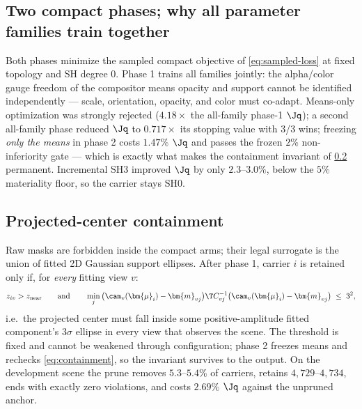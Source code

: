 \subsection{Two compact phases; why all parameter families train together}
\label{sec:phases}

Both phases minimize the sampled compact objective of \cref{eq:sampled-loss} at fixed
topology and SH degree 0.  Phase 1 trains all families jointly: the alpha/color gauge freedom
of the compositor means opacity and support cannot be identified independently --- scale,
orientation, opacity, and color must co-adapt.  Means-only optimization was strongly
rejected ($4.18\times$ the all-family phase-1 $\Jq$); a second all-family phase reduced
$\Jq$ to $0.717\times$ its stopping value with 3/3 wins; freezing \emph{only the means} in
phase 2 costs $1.47\%$ $\Jq$ and passes the frozen $2\%$ non-inferiority gate --- which is
exactly what makes the containment invariant of \cref{sec:containment} permanent.
Incremental SH3 improved $\Jq$ by only $2.3$--$3.0\%$, below the $5\%$ materiality floor, so
the carrier stays SH0.

\subsection{Projected-center containment}
\label{sec:containment}

Raw masks are forbidden inside the compact arms; their legal surrogate is the union of fitted
2D Gaussian support ellipses.  After phase 1, carrier $i$ is retained only if, for
\emph{every} fitting view $v$:
\begin{equation}
  z_{iv} > z_{\text{near}}
  \qquad\text{and}\qquad
  \min_j \big(\cam_v(\bm{\mu}_i) - \bm{m}_{vj}\big)\T C_{vj}^{-1}
         \big(\cam_v(\bm{\mu}_i) - \bm{m}_{vj}\big) \;\le\; 3^2,
  \label{eq:containment}
\end{equation}
i.e.\ the projected center must fall inside some positive-amplitude fitted component's
$3\sigma$ ellipse in every view that observes the scene.  The threshold is fixed and cannot
be weakened through configuration; phase 2 freezes means and rechecks
\cref{eq:containment}, so the invariant survives to the output.  On the development scene the
prune removes $5.3$--$5.4\%$ of carriers, retains $4{,}729$--$4{,}734$, ends with exactly
zero violations, and costs $2.69\%$ $\Jq$ against the unpruned
anchor.

